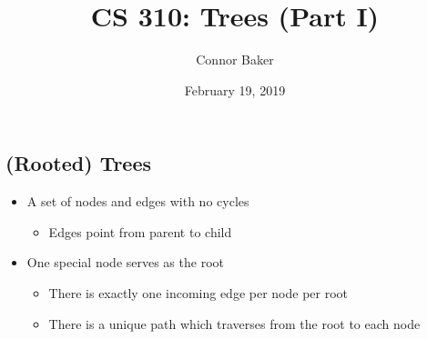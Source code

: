 \documentclass[10pt]{article}
\title{CS 310: Trees (Part I)}
\author{Connor Baker}
\date{February 19, 2019}
\begin{document}
\maketitle

\subsection*{(Rooted) Trees}
\begin{itemize}
    \item A set of nodes and edges with no cycles
    \begin{itemize}
        \item Edges point from parent to child
    \end{itemize}
    \item One special node serves as the root
    \begin{itemize}
        \item There is exactly one incoming edge per node per root
        \item There is a unique path which traverses from the root to each node
    \end{itemize}
\end{itemize}
\end{document}
